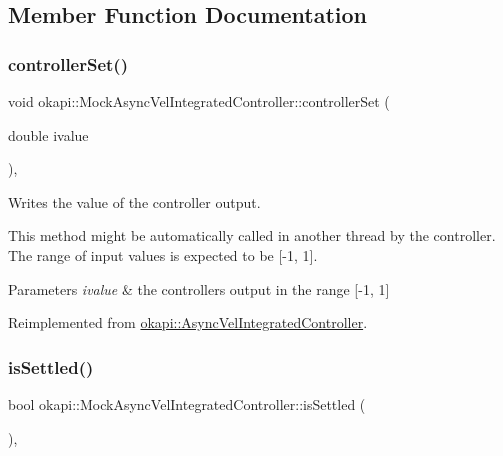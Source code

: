 \subsection{Member Function Documentation}
\mbox{\label{classokapi_1_1MockAsyncVelIntegratedController_a7992b27e427fd6340a50af32ffca7854}} 
\subsubsection{\texorpdfstring{controllerSet()}{controllerSet()}}
{\footnotesize\ttfamily void okapi\+::\+Mock\+Async\+Vel\+Integrated\+Controller\+::controller\+Set (\begin{DoxyParamCaption}\item[{double}]{ivalue }\end{DoxyParamCaption})\hspace{0.3cm}{\ttfamily [override]}, {\ttfamily [virtual]}}



Writes the value of the controller output. 

This method might be automatically called in another thread by the controller. The range of input values is expected to be \mbox{[}-\/1, 1\mbox{]}.


\begin{DoxyParams}{Parameters}
{\em ivalue} & the controller\textquotesingle{}s output in the range \mbox{[}-\/1, 1\mbox{]} \\
\hline
\end{DoxyParams}


Reimplemented from \mbox{\hyperlink{classokapi_1_1AsyncVelIntegratedController_ae50c09f44077284278e4d8a80656077d}{okapi\+::\+Async\+Vel\+Integrated\+Controller}}.

\mbox{\label{classokapi_1_1MockAsyncVelIntegratedController_a2f33eb51499bbc158d9d604f4c568b4f}} 
\subsubsection{\texorpdfstring{isSettled()}{isSettled()}}
{\footnotesize\ttfamily bool okapi\+::\+Mock\+Async\+Vel\+Integrated\+Controller\+::is\+Settled (\begin{DoxyParamCaption}{ }\end{DoxyParamCaption})\hspace{0.3cm}{\ttfamily [override]}, {\ttfamily [virtual]}}



